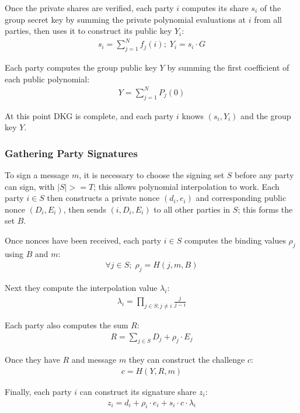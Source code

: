 \documentclass{article}
\begin{document}
Once the private shares are verified, each party $i$ computes its share $s_i$ of the group secret key by summing the private polynomial evaluations at $i$ from all parties, then uses it to construct its public key $Y_i$:
\begin{align}
  s_i = \sum_{j=1}^{N} f_j(i) ;\; Y_i = s_i \cdot G
\end{align}

Each party computes the group public key $Y$ by summing the first coefficient of each public polynomial:
\begin{align}
  Y = \sum_{j=1}^{N} P_j(0)
\end{align}

At this point DKG is complete, and each party $i$ knows $(s_i, Y_i)$ and the group key $Y$.

\newpage
\onecolumn
\subsubsection{
  Gathering Party Signatures
}

To sign a message $m$, it is necessary to choose the signing set $S$ before any party can sign, with $|S| >= T$; this allows polynomial interpolation to work.  Each party $i \in S$ then constructs a private nonce $(d_i,e_i)$ and corresponding public nonce $(D_i,E_i)$, then sends $(i, D_i, E_i)$ to all other parties in $S$; this forms the set $B$.

Once nonces have been received, each party $i \in S$ computes the binding values $\rho_j$ using $B$ and $m$:
\begin{align}
  \forall j \in S;\;\rho_j = H(j, m, B)
\end{align}

Next they compute the interpolation value $\lambda_i$:
\begin{align}
  \lambda_i = \prod_{j \in S; j \neq i}^{} \frac{j}{j - i}
\end{align}

Each party also computes the sum $R$:
\begin{align}
  R = \sum_{j \in S}^{} D_j + \rho_j \cdot E_j
\end{align}

Once they have $R$ and message $m$ they can construct the challenge $c$:
\begin{align}
  c = H(Y, R, m)
\end{align}

Finally, each party $i$ can construct its signature share $z_i$:
\begin{align}
  z_i = d_i + \rho_i \cdot e_i + s_i \cdot c \cdot \lambda_i
\end{align}
\end{document}
